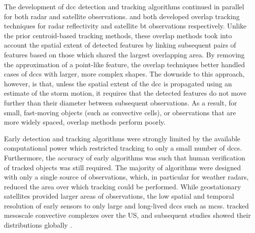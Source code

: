 The development of \acrshort{dcc} detection and tracking algorithms continued in parallel for both radar and satellite observations.
\citet{rosenfeld_objective_1987} and \citet{williams_satellite-observed_1987} both developed overlap tracking techniques for radar reflectivity and satellite \acrshort{bt} observations respectively.
Unlike the prior centroid-based tracking methods, these overlap methods took into account the spatial extent of detected features by linking subsequent pairs of features based on those which shared the largest overlapping area.
By removing the approximation of a point-like feature, the overlap techniques better handled cases of \acrshort{dcc}s with larger, more complex shapes.
The downside to this approach, however, is that, unless the spatial extent of the \acrshort{dcc} is propagated using an estimate of the storm motion, it requires that the detected features do not move further than their diameter between subsequent observations.
As a result, for small, fast-moving objects (such as convective cells), or observations that are more widely spaced, overlap methods perform poorly.

Early detection and tracking algorithms were strongly limited by the available computational power which restricted tracking to only a small number of \acrshort{dcc}s. 
Furthermore, the accuracy of early algorithms was such that human verification of tracked objects was still required. 
The majority of algorithms were designed with only a single source of observations, which, in particular for weather radars, reduced the area over which tracking could be performed. 
While geostationary satellites provided larger areas of observations, the low spatial and temporal resolution of early sensors to only large and long-lived \acrshort{dcc}s such as \acrshort{mcs}s. 
\citet{maddox_mesoscale_1980a} tracked mesoscale convective complexes over the US, and subsequent studies showed their distributions globally \citep{laing_global_1997}.

